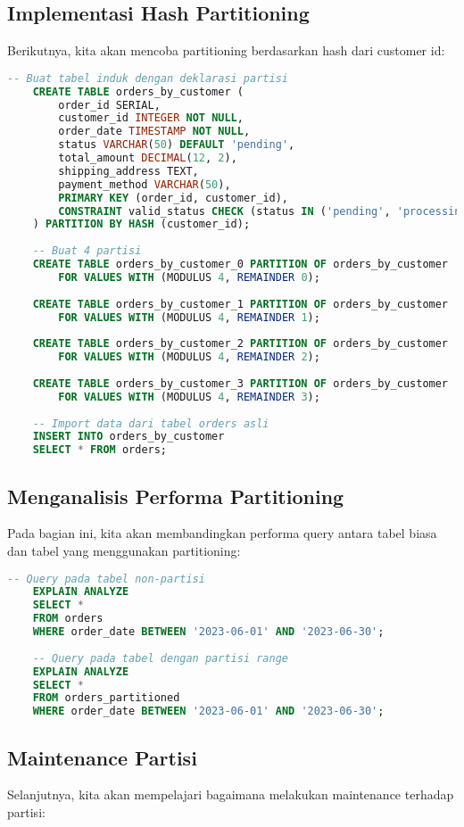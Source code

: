 \subsection{Implementasi Hash Partitioning}
Berikutnya, kita akan mencoba partitioning berdasarkan hash dari customer id:

\begin{lstlisting}[language=SQL]
	-- Buat tabel induk dengan deklarasi partisi
	CREATE TABLE orders_by_customer (
		order_id SERIAL,
		customer_id INTEGER NOT NULL,
		order_date TIMESTAMP NOT NULL,
		status VARCHAR(50) DEFAULT 'pending',
		total_amount DECIMAL(12, 2),
		shipping_address TEXT,
		payment_method VARCHAR(50),
		PRIMARY KEY (order_id, customer_id),
		CONSTRAINT valid_status CHECK (status IN ('pending', 'processing', 'shipped', 'delivered', 'cancelled'))
	) PARTITION BY HASH (customer_id);
	
	-- Buat 4 partisi
	CREATE TABLE orders_by_customer_0 PARTITION OF orders_by_customer
		FOR VALUES WITH (MODULUS 4, REMAINDER 0);
	
	CREATE TABLE orders_by_customer_1 PARTITION OF orders_by_customer
		FOR VALUES WITH (MODULUS 4, REMAINDER 1);
	
	CREATE TABLE orders_by_customer_2 PARTITION OF orders_by_customer
		FOR VALUES WITH (MODULUS 4, REMAINDER 2);
	
	CREATE TABLE orders_by_customer_3 PARTITION OF orders_by_customer
		FOR VALUES WITH (MODULUS 4, REMAINDER 3);
	
	-- Import data dari tabel orders asli
	INSERT INTO orders_by_customer
	SELECT * FROM orders;
\end{lstlisting}

\subsection{Menganalisis Performa Partitioning}
Pada bagian ini, kita akan membandingkan performa query antara tabel biasa dan tabel yang menggunakan partitioning:

\begin{lstlisting}[language=SQL]
	-- Query pada tabel non-partisi
	EXPLAIN ANALYZE
	SELECT *
	FROM orders
	WHERE order_date BETWEEN '2023-06-01' AND '2023-06-30';
	
	-- Query pada tabel dengan partisi range
	EXPLAIN ANALYZE
	SELECT *
	FROM orders_partitioned
	WHERE order_date BETWEEN '2023-06-01' AND '2023-06-30';
\end{lstlisting}

\subsection{Maintenance Partisi}
Selanjutnya, kita akan mempelajari bagaimana melakukan maintenance terhadap partisi:

